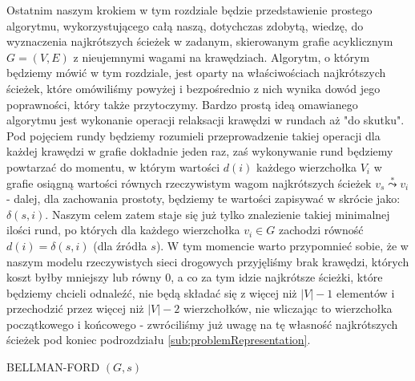 Ostatnim naszym krokiem w tym rozdziale będzie przedstawienie prostego algorytmu, wykorzystującego całą naszą, dotychczas zdobytą, wiedzę, do wyznaczenia najkrótszych ścieżek w zadanym, skierowanym grafie acyklicznym $G = \left( V, E \right)$ z nieujemnymi wagami na krawędziach. Algorytm, o którym będziemy mówić w tym rozdziale, jest oparty na właściwościach najkrótszych ścieżek, które omówiliśmy powyżej i bezpośrednio z nich wynika dowód jego poprawności, który także przytoczymy. Bardzo prostą ideą omawianego algorytmu jest wykonanie operacji relaksacji krawędzi w rundach aż "do skutku". Pod pojęciem rundy będziemy rozumieli przeprowadzenie takiej operacji dla każdej krawędzi w grafie dokładnie jeden raz, zaś wykonywanie rund będziemy powtarzać do momentu, w którym wartości $ d \left( i \right) $ każdego wierzchołka $V_{i}$ w grafie osiągną wartości równych rzeczywistym wagom najkrótszych ścieżek $v_{s} \overset{*}\leadsto v_{i}$ - dalej, dla zachowania prostoty, będziemy te wartości zapisywać w skrócie jako: $ \delta \left( s, i \right)$. Naszym celem zatem staje się już tylko znalezienie takiej minimalnej ilości rund, po których dla każdego wierzchołka $ v_{i} \in G $ zachodzi równość $ d \left( i \right) = \delta \left( s, i \right) $ (dla źródła $ s $). W tym momencie warto przypomnieć sobie, że w naszym modelu rzeczywistych sieci drogowych przyjęliśmy brak krawędzi, których koszt byłby mniejszy lub równy $ 0 $, a co za tym idzie najkrótsze ścieżki, które będziemy chcieli odnaleźć, nie będą składać się z więcej niż $ \left| V \right| - 1 $ elementów i przechodzić przez więcej niż  $ \left| V \right| -2 $ wierzchołków, nie wliczając to wierzchołka początkowego i końcowego - zwróciliśmy już uwagę na tę własność najkrótszych ścieżek pod koniec podrozdziału \ref{sub:problemRepresentation}.

\begin{algorithm}[!htbp]
\DontPrintSemicolon
{}
\caption{ BELLMAN-FORD $\left( G, s \right)$\label{alg:BellmanFord}}
\end{algorithm}

